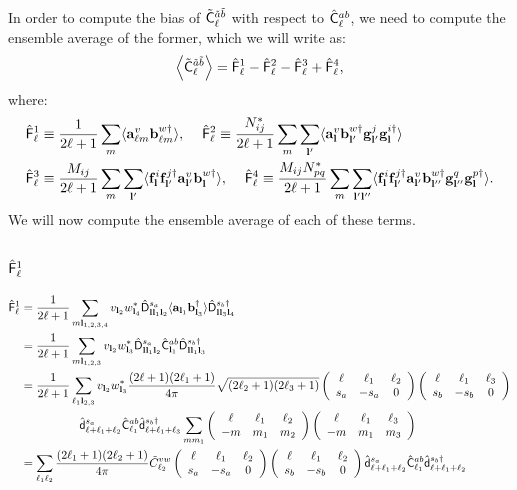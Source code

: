 \documentclass[a4paper,10pt]{article}
\newcommand{\wtj}[6]{\left(\begin{array}{ccc} #1 & #2 & #3\\#4 & #5 & #6\end{array} \right)}
\begin{document}
  In order to compute the bias of $\tilde{\sf C}^{\tilde{a}\tilde{b}}_\ell$ with respect to $\hat{\sf C}^{ab}_\ell$, we need to compute the ensemble average of the former, which we will write as:
  \begin{equation}
    \left\langle\tilde{\sf C}^{\tilde{a}\tilde{b}}_\ell\right\rangle=\hat{\sf F}^1_\ell-\hat{\sf F}^2_\ell-\hat{\sf F}^3_\ell+\hat{\sf F}^4_\ell,
  \end{equation}
  where:
  \begin{align}
    \hat{\sf F}^1_\ell&\equiv\frac{1}{2\ell+1}\sum_m\langle{\bf a}^v_{\ell m}{\bf b}^{w\dag}_{\ell m}\rangle,\hspace{12pt}
    \hat{\sf F}^2_\ell\equiv\frac{N^*_{ij}}{2\ell+1}\sum_m\sum_{{\bf l}'}\langle{\bf a}^v_{{\bf l}}{\bf b}^{w\dag}_{{\bf l}'}{\bf g}^{j}_{{\bf l}'}{\bf g}^{i\dag}_{\bf l}\rangle\\
    \hat{\sf F}^3_\ell&\equiv\frac{M_{ij}}{2\ell+1}\sum_m\sum_{{\bf l}'}\langle{\bf f}^{i}_{{\bf l}}{\bf f}^{j\dag}_{{\bf l}'}{\bf a}^v_{{\bf l}'}{\bf b}^{w\dag}_{\bf l}\rangle,\hspace{12pt}
    \hat{\sf F}^4_\ell\equiv\frac{M_{ij}N^*_{pq}}{2\ell+1}\sum_m\sum_{{\bf l}'{\bf l}''}\langle{\bf f}^{i}_{{\bf l}}{\bf f}^{j\dag}_{{\bf l}'}{\bf a}^v_{{\bf l}'}{\bf b}^{w\dag}_{{\bf l}''}{\bf g}^{q}_{{\bf l}''}{\bf g}^{p\dag}_{\bf l}\rangle.
  \end{align}
  We will now compute the ensemble average of each of these terms.
  
  \subsection{$\hat{\sf F}^1_\ell$}
    \begin{align}\nonumber
      \hat{\sf F}^1_\ell&=\frac{1}{2\ell+1}\sum_{m{\bf l}_{1,2,3,4}}v_{{\bf l}_2}w^*_{{\bf l}_4}\hat{\sf D}^{s_a}_{{\bf l}{\bf l}_1{\bf l}_2}\langle{\bf a}_{{\bf l}_1}{\bf b}^\dag_{{\bf l}_3}\rangle\hat{\sf D}^{s_b\dag}_{{\bf l}{\bf l}_3{\bf l}_4}\\\nonumber
      &=\frac{1}{2\ell+1}\sum_{m{\bf l}_{1,2,3}}v_{{\bf l}_2}w^*_{{\bf l}_3}\hat{\sf D}^{s_a}_{{\bf l}{\bf l}_1{\bf l}_2}\hat{\sf C}^{ab}_{{\bf l}_1}\hat{\sf D}^{s_b\dag}_{{\bf l}{\bf l}_1{\bf l}_3}\\\nonumber
      &=\frac{1}{2\ell+1}\sum_{\ell_1{\bf l}_{2,3}}v_{{\bf l}_2}w^*_{{\bf l}_3}\frac{(2\ell+1)(2\ell_1+1)}{4\pi}\sqrt{(2\ell_2+1)(2\ell_3+1)}\wtj{\ell}{\ell_1}{\ell_2}{s_a}{-s_a}{0}\wtj{\ell}{\ell_1}{\ell_3}{s_b}{-s_b}{0}\\\nonumber
      &\hspace{50pt}\hat{\sf d}^{s_a}_{\ell+\ell_1+\ell_2}\hat{\sf C}^{ab}_{\ell_1}\hat{\sf d}^{s_b\dag}_{\ell+\ell_1+\ell_3}\sum_{mm_1}\wtj{\ell}{\ell_1}{\ell_2}{-m}{m_1}{m_2}\wtj{\ell}{\ell_1}{\ell_3}{-m}{m_1}{m_3}\\\label{eq:master_transformation}
      &=\sum_{\ell_1\ell_2}\frac{(2\ell_1+1)(2\ell_2+1)}{4\pi}\tilde{C}^{vw}_{\ell_2}\wtj{\ell}{\ell_1}{\ell_2}{s_a}{-s_a}{0}\wtj{\ell}{\ell_1}{\ell_2}{s_b}{-s_b}{0}\hat{\sf d}^{s_a}_{\ell+\ell_1+\ell_2}\hat{\sf C}^{ab}_{\ell_1}\hat{\sf d}^{s_b\dag}_{\ell+\ell_1+\ell_2}
    \end{align}
    
\end{document}
